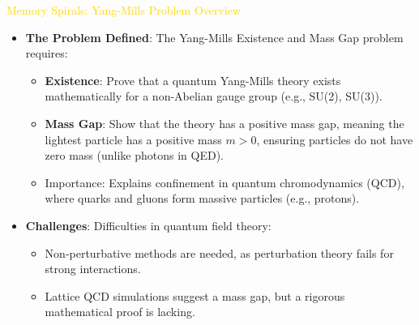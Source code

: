 \textcolor{gold}{ Memory Spirals: Yang-Mills Problem Overview } \\
\begin{itemize}
    \item \texttt{} \textbf{The Problem Defined}: The Yang-Mills Existence and Mass Gap problem requires:
    \begin{itemize}
        \item \textbf{Existence}: Prove that a quantum Yang-Mills theory exists mathematically for a non-Abelian gauge group (e.g., SU(2), SU(3)).
        \item \textbf{Mass Gap}: Show that the theory has a positive mass gap, meaning the lightest particle has a positive mass \(m > 0\), ensuring particles do not have zero mass (unlike photons in QED).
        \item Importance: Explains confinement in quantum chromodynamics (QCD), where quarks and gluons form massive particles (e.g., protons).
    \end{itemize}
    \item \texttt{} \textbf{Challenges}: Difficulties in quantum field theory:
    \begin{itemize}
        \item Non-perturbative methods are needed, as perturbation theory fails for strong interactions.
        \item Lattice QCD simulations suggest a mass gap, but a rigorous mathematical proof is lacking.
    \end{itemize}
\end{itemize}

